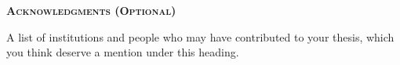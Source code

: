 %
%
%             
% 
% 
% 

\cleardoublepage

{\Large \textbf{\textsc{Acknowledgments (Optional)}}}

\vspace{0.65cm}

A list of institutions and people who may have contributed to your thesis, which you think deserve a mention under this heading.

\newpage

